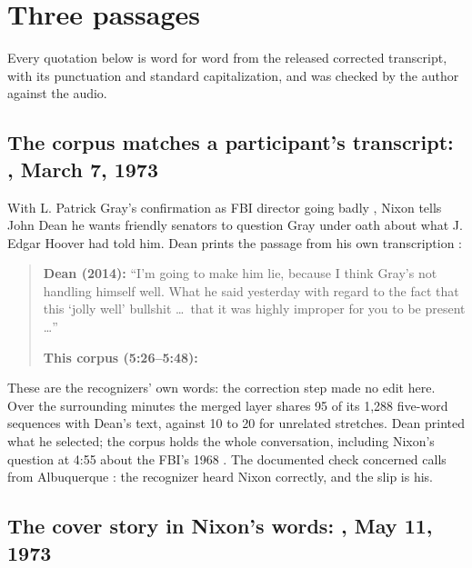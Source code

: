 \section{Three passages}
\label{sec:cases}

Every quotation below is word for word from the released corrected transcript, with its punctuation and standard capitalization, and was checked by the author against the audio.

\subsection{The corpus matches a participant's transcript: , March 7, 1973}
\label{sec:case-dean}

With L. Patrick Gray's confirmation as FBI director going badly \citep{crs2018fbi}, Nixon tells John Dean he wants friendly senators to question Gray under oath about what J. Edgar Hoover had told him. Dean prints the passage from his own transcription \citep[Conversation No.~871-4]{dean2014defense}:

\begin{quote}\small
\textbf{Dean (2014):} \enquote{I'm going to make him lie, because I think Gray's not handling himself well. What he said yesterday with regard to the fact that this `jolly well' bullshit \ldots\ that it was highly improper for you to be present \ldots}

\textbf{This corpus (5:26--5:48):} 
\end{quote}

These are the recognizers' own words: the correction step made no edit here. Over the surrounding minutes the merged layer shares 95 of its 1,288 five-word sequences with Dean's text, against 10 to 20 for unrelated stretches. Dean printed what he selected; the corpus holds the whole conversation, including Nixon's question at 4:55 about the FBI's 1968 . The documented check concerned calls from Albuquerque \citep{johnson1968deloach,hughes2014chasing}: the recognizer heard Nixon correctly, and the slip is his.

\subsection{The cover story in Nixon's words: , May 11, 1973}
\label{sec:case-916}

